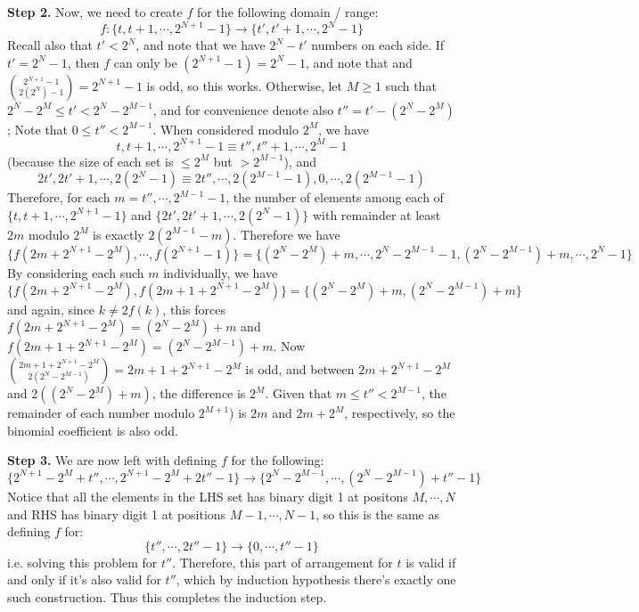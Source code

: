 \documentclass[11pt,a4paper]{article}
\begin{document}
	\textbf{Step 2.} 
	Now, we need to create $f$ for the following domain / range: 
	\[
	f : \{t, t + 1, \cdots, 2^{N + 1} - 1\}\to \{t', t' + 1, \cdots, 2^N - 1\}
	\]
	Recall also that $t' < 2^N$, and note that we have $2^N - t'$ numbers on each side. 
	If $t' = 2^N - 1$, then $f$ can only be $(2^{N + 1} - 1) = 2^{N} - 1$, and note that 
	and $\binom{2^{N + 1} - 1}{2(2^N) - 1} = 2^{N + 1} - 1$ is odd, so this works. 
	Otherwise, 
	let $M\ge 1$ such that $2^N - 2^M\le t' < 2^N - 2^{M - 1}$,  
	and for convenience denote also $t'' = t' - (2^N - 2^M)$; 
	Note that $0\le t'' < 2^{M - 1}$. 
	When considered modulo $2^{M}$, we have 
	\[
	t, t + 1, \cdots, 2^{N + 1} - 1\equiv 
	t'', t'' + 1, \cdots, 2^M - 1
	\]
	(because the size of each set is $\le 2^M$ but $> 2^{M - 1}$), and 
	\[
	2t', 2t' + 1, \cdots, 2(2^N - 1)\equiv 2t'', \cdots, 2(2^{M - 1} - 1), 0, \cdots, 2(2^{M - 1} - 1)
	\]
	Therefore, for each $m = t'', \cdots, 2^{M - 1} - 1$, 
	the number of elements among each of $\{t, t + 1, \cdots, 2^{N + 1} - 1\}$ and $\{2t', 2t' + 1, \cdots, 2(2^N - 1)\}$ 
	with remainder at least $2m$ modulo $2^M$ is exactly 
	$2(2^{M - 1} - m)$. 
	Therefore we have 
	\[
	\{f(2m + 2^{N+1} - 2^{M}), \cdots, f(2^{N + 1} - 1)\}
	=\{(2^N - 2^M) + m, \cdots, 2^N - 2^{M - 1} - 1, (2^N - 2^{M - 1}) + m, \cdots, 2^N - 1\}
	\]
	By considering each such $m$ individually, we have 
	\[
	\{f(2m + 2^{N+1} - 2^M), f(2m + 1 + 2^{N+1} - 2^M)\}
	=\{(2^N - 2^M) + m, (2^N - 2^{M - 1}) + m\}
	\]
	and again, since $k\neq 2f(k)$, this forces $f(2m + 2^{N+1} - 2^M) = (2^N - 2^M) + m$ and 
	$f(2m + 1 + 2^{N+1} - 2^M) = (2^N - 2^{M - 1}) + m$. 
	Now $\binom{2m + 1 + 2^{N+1} - 2^M}{2(2^N - 2^{M - 1})} = 2m + 1 + 2^{N+1} - 2^M$ is odd, 
	and between $2m + 2^{N+1} - 2^M$ and $2((2^N - 2^M) + m)$, 
	the difference is $2^M$. 
	Given that $m\le t'' < 2^{M - 1}$, the remainder of each number modulo $2^{M + 1}$) 
	is $2m$ and $2m + 2^M$, respectively, 
	so the binomial coefficient is also odd. 
	
	\textbf{Step 3.} 
	We are now left with defining $f$ for the following: 
	\[
	\{2^{N + 1} - 2^M + t'', \cdots, 2^{N + 1} - 2^M + 2t'' - 1\}\to 
	\{2^N - 2^{M - 1}, \cdots, (2^N - 2^{M - 1}) + t'' - 1\}
	\]
	Notice that all the elements in the LHS set has binary digit 1 at positons $M, \cdots, N$ and 
	RHS has binary digit 1 at positions $M - 1, \cdots, N - 1$, 
	so this is the same as defining $f$ for: 
	\[
	\{ t'', \cdots, 2t'' - 1\}\to 
	\{0, \cdots, t'' - 1\}
	\]
	i.e. solving this problem for $t''$. 
	Therefore, this part of arrangement for $t$ is valid if and only if it's also valid for $t''$, 
	which by induction hypothesis there's exactly one such construction. 
	Thus this completes the induction step. 
	
\end{document}

